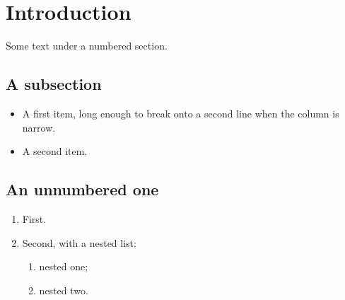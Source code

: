 \documentclass{article}
\begin{document}
\section{Introduction}
Some text under a numbered section.
\subsection{A subsection}
\begin{itemize}
  \item A first item, long enough to break onto a second line when the
        column is narrow.
  \item A second item.
\end{itemize}
\subsection*{An unnumbered one}
\begin{enumerate}
  \item First.
  \item Second, with a nested list:
  \begin{enumerate}
    \item nested one;
    \item nested two.
  \end{enumerate}
\end{enumerate}
\end{document}
